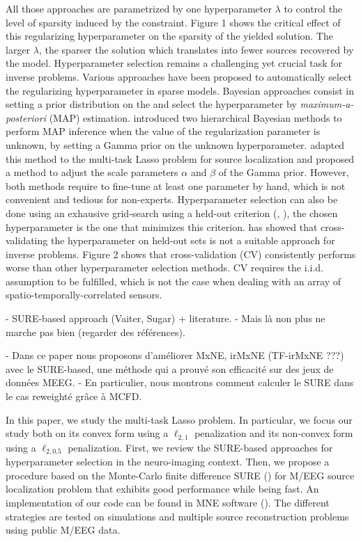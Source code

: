 All those approaches are parametrized by one hyperparameter $\lambda$ to control the level of 
sparsity induced by the constraint. Figure 1 shows the critical effect of this regularizing hyperparameter 
on the sparsity of the yielded solution. The larger $\lambda$, the sparser the solution which translates
into fewer sources recovered by the model. Hyperparameter selection remains a challenging yet crucial task
for inverse problems. Various approaches have been proposed to automatically select the regularizing 
hyperparameter in sparse models. Bayesian approaches consist in setting a prior distribution on the 
and select the hyperparameter by \textit{maximum-a-posteriori} (MAP) estimation. 
\cite{Pereyra_BioucasDias_Figueiredo_2015} introduced two hierarchical Bayesian methods to perform MAP 
inference when the value of the regularization parameter is unknown, by setting a Gamma prior on the 
unknown hyperparameter. \cite{Bekhti_Badeau_Gramfort_2017} adapted this method to the multi-task Lasso problem
for source localization and proposed a method to adjust the scale parameters $\alpha$ and $\beta$
of the Gamma prior. However, both methods require to fine-tune at least one parameter by hand, which is not
convenient and tedious for non-experts. Hyperparameter selection can also be done using an exhausive
grid-search using a held-out criterion (\cite{Bergstra_Bengio12}, \cite{BergstraBardenetBengioKegl2011}), 
the chosen hyperparameter is the one that minimizes this criterion. \cite{Pedregosa16} has 
showed that cross-validating the hyperparameter on held-out sets is not a suitable approach for inverse 
problems. Figure 2 shows that cross-validation (CV) consistently performs worse than other 
hyperparameter selection methods. CV requires the i.i.d. assumption to be fulfilled, which is 
not the case when dealing with an array of spatio-temporally-correlated sensors. 


- SURE-based approach (Vaiter, Sugar) + literature.
- Mais là non plus ne marche pas bien (regarder des références).

- Dans ce paper nous proposons d'améliorer MxNE, irMxNE (TF-irMxNE ???) avec
le SURE-based, une méthode qui a prouvé son efficacité sur des jeux de données MEEG.
- En particulier, nous montrons comment calculer le SURE dans le cas reweighté grâce à
MCFD.


In this paper, we study the multi-task Lasso problem. In particular, we focus 
our study both on its convex form using a $\ell_{2, 1}$ penalization and its non-convex 
form using a $\ell_{2, 0.5}$ penalization. First, we review the SURE-based approaches
for hyperparameter selection in the neuro-imaging context. Then, we propose a 
procedure based on the Monte-Carlo finite difference SURE (\cite{Deledalle_Vaiter_Fadili_Peyre14})
for M/EEG source localization problem that exhibits good performance while being
fast. An implementation of our code can be found in MNE software (\cite{mne}).
The different strategies are tested on simulations and multiple source reconstruction 
problems using public M/EEG data.


